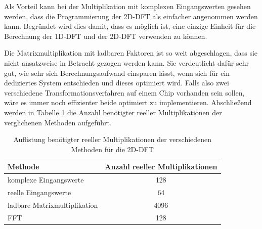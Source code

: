 Als Vorteil kann bei der Multiplikation mit komplexen Eingangswerten gesehen werden, dass die Programmierung der 2D-DFT als einfacher angenommen werden kann.
Begründet wird dies damit, dass es möglich ist, eine einzige Einheit für die Berechnung der 1D-DFT und der 2D-DFT verwenden zu können.

Die Matrixmultiplikation mit ladbaren Faktoren ist so weit abgeschlagen, dass sie nicht ansatzweise in Betracht gezogen werden kann. Sie verdeutlicht
dafür sehr gut, wie sehr sich Berechnungsaufwand einsparen lässt, wenn sich für ein dediziertes System entschieden und dieses optimiert wird.
Falls also zwei verschiedene Transformationsverfahren auf einem Chip vorhanden sein sollen, wäre es immer noch effizienter beide optimiert zu implementieren.
Abschließend werden in Tabelle \ref{tab:AuflistungMultiplikationen} die Anzahl benötigter reeller Multiplikationen der verglichenen Methoden aufgeführt.


\begin{table}[ht!]
\centering
\caption{Auflistung benötigter reeller Multiplikationen der verschiedenen Methoden für die 2D-DFT}
 \begin{tabular}{lc}
  \hline
  Methode  & Anzahl reeller Multiplikationen\\
  \hline
  komplexe Eingangswerte & 128\\
  reelle Eingangswerte   & 64\\
  ladbare Matrixmultiplikation & 4096\\
  FFT   & 128\\
  \hline
 \end{tabular}
 \label{tab:AuflistungMultiplikationen}
\end{table}
